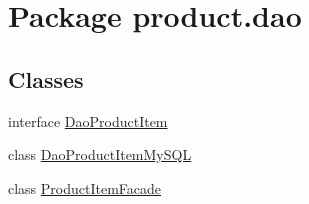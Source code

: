 \hypertarget{namespaceproduct_1_1dao}{}\section{Package product.\+dao}
\label{namespaceproduct_1_1dao}
\subsection*{Classes}
\begin{DoxyCompactItemize}
\item 
interface \mbox{\hyperlink{interfaceproduct_1_1dao_1_1_dao_product_item}{Dao\+Product\+Item}}
\item 
class \mbox{\hyperlink{classproduct_1_1dao_1_1_dao_product_item_my_s_q_l}{Dao\+Product\+Item\+My\+S\+QL}}
\item 
class \mbox{\hyperlink{classproduct_1_1dao_1_1_product_item_facade}{Product\+Item\+Facade}}
\end{DoxyCompactItemize}
